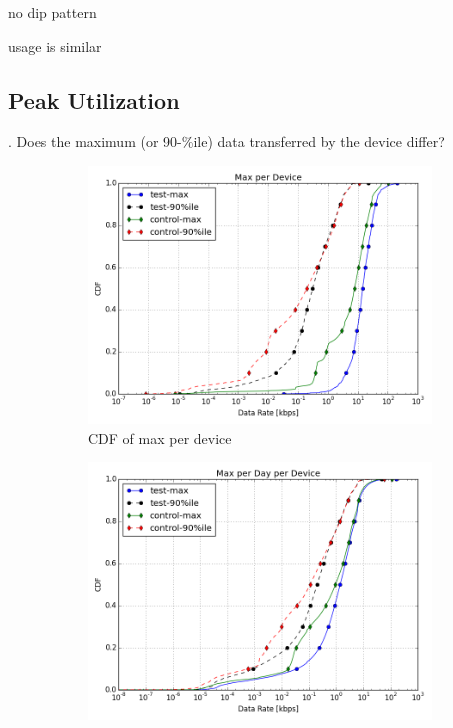no dip pattern

usage is similar 


\subsection{Peak Utilization}
\label{subsec:peak-util}

. Does the maximum (or 90-\%ile) data transferred by the device differ?


\begin{figure}[t!]
\begin{minipage}{1\linewidth}
\centering
%
\begin{subfigure}[b]{\linewidth}
\includegraphics[width=\linewidth]{figures/cdf-max-per-device.png}
  \caption{CDF of max per device}
  \label{fig:CDF-data-rate-max}
\end{subfigure}
%
\vspace{-1em}
%
\begin{subfigure}[b]{\linewidth}
\includegraphics[width=\linewidth]{figures/cdf-max-per-day-per-device.png}

\end{subfigure}
\end{minipage}
\end{figure}
